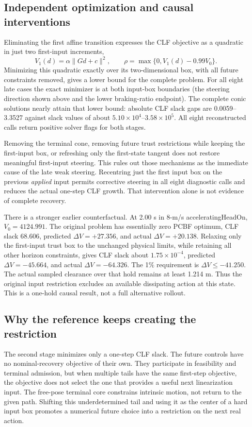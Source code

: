 \documentclass[11pt]{article}
\begin{document}
\subsection{Independent optimization and causal interventions}
Eliminating the first affine transition expresses the CLF objective as a
quadratic in just two first-input increments,
\[
 V_1(d)=\alpha\|Gd+c\|^2,\qquad
 \rho=\max\{0,V_1(d)-0.99V_0\}.
\]
Minimizing this quadratic exactly over its two-dimensional box, with all
future constraints removed, gives a lower bound for the complete problem.
For all eight late cases the exact minimizer is at both input-box boundaries
(the steering direction shown above and the lower braking-ratio endpoint).
The complete conic solutions nearly attain that lower bound: absolute CLF
slack gaps are 0.0059--3.3527 against slack values of about
$5.10\times10^4$--$3.58\times10^5$. All eight reconstructed calls return
positive solver flags for both stages.

Removing the terminal cone, removing future trust restrictions while keeping
the first-input box, or refreshing only the first-state tangent does not
restore meaningful first-input steering. This rules out those mechanisms as
the immediate cause of the late weak steering. Recentring just the first
input box on the previous \emph{applied} input permits corrective steering in
all eight diagnostic calls and reduces the actual one-step CLF growth.
That intervention alone is not evidence of complete recovery.

There is a stronger earlier counterfactual. At 2.00 s in 8-m/s
acceleratingHeadOn, $V_0=4124.991$. The original problem has essentially zero
PCBF optimum, CLF slack 68.606, predicted $\Delta V=+27.356$, and actual
$\Delta V=+20.138$. Relaxing only the first-input trust box to the unchanged
physical limits, while retaining all other horizon constraints, gives CLF
slack about $1.75\times10^{-4}$, predicted $\Delta V=-45.664$, and actual
$\Delta V=-64.326$. The 1\% requirement is $\Delta V\le-41.250$.
The actual sampled clearance over that hold remains at least 1.214 m.
Thus the original input restriction excludes an available dissipating action
at this state. This is a one-hold causal result, not a full alternative rollout.

\subsection{Why the reference keeps creating the restriction}
The second stage minimizes only a one-step CLF slack. The future controls
have no nominal-recovery objective of their own. They participate in
feasibility and terminal admission, but when multiple tails have the same
first-step objective, the objective does not select the one that provides a
useful next linearization input. The free-pose terminal core constrains
intrinsic motion, not return to the given path. Shifting this underdetermined
tail and using it as the center of a hard input box promotes a numerical
future choice into a restriction on the next real action.
\end{document}
